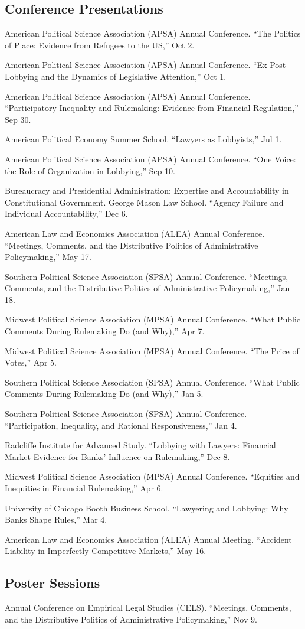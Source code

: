\documentclass[12pt,letterpaper]{report}
\newcommand{\talk}[4]{\item[#1]{\tab{}#3. \enquote{#2,} #4.}} %
\newcommand{\APSA}{American Political Science Association (APSA) Annual Conference}
\begin{document}
    \subsection*{Conference Presentations}
    \begin{tablist}
    \talk{2021}{The Politics of Place: Evidence from Refugees to the US}{\APSA}{Oct 2}
    \talk{2021}{Ex Post Lobbying and the Dynamics of Legislative Attention}{\APSA}{Oct 1}
    \talk{2021}{Participatory Inequality and Rulemaking: Evidence from Financial Regulation}{\APSA}{Sep 30}
    \talk{2021}{Lawyers as Lobbyists}{American Political Economy Summer School}{Jul 1}
    \talk{2020}{One Voice: the Role of Organization in Lobbying}{\APSA}{Sep 10}
    \talk{2019}{Agency Failure and Individual Accountability}{Bureaucracy and Presidential Administration: Expertise and Accountability in Constitutional Government. George Mason Law School}{Dec 6}
    \talk{2019}{Meetings, Comments, and the Distributive Politics of Administrative Policymaking}{American Law and Economics Association (ALEA) Annual Conference}{May 17}
    \talk{2019}{Meetings, Comments, and the Distributive Politics of Administrative Policymaking}{Southern Political Science Association (SPSA) Annual Conference}{Jan 18} 
    \talk{2018}{What Public Comments During Rulemaking Do (and Why)}{Midwest Political Science Association (MPSA) Annual Conference}{Apr 7}
    \talk{2018}{The Price of Votes}{Midwest Political Science Association (MPSA) Annual Conference}{Apr 5}
    \talk{2018}{What Public Comments During Rulemaking Do (and Why)}{Southern Political Science Association (SPSA) Annual Conference}{Jan 5} 
    \talk{2018}{Participation, Inequality, and Rational Responsiveness}{Southern Political Science Association (SPSA) Annual Conference}{Jan 4}    
    \talk{2017}{Lobbying with Lawyers: Financial Market Evidence for Banks’ Influence on Rulemaking}{Radcliffe Institute for Advanced Study}{Dec 8}
    \talk{2017}{Equities and Inequities in Financial Rulemaking}{Midwest Political Science Association (MPSA) Annual Conference}{Apr 6}
	\talk{2017}{Lawyering and Lobbying: Why Banks Shape Rules}{University of Chicago Booth Business School}{Mar 4}
	\talk{2015}{Accident Liability in Imperfectly Competitive Markets}{American Law and Economics Association (ALEA) Annual Meeting}{May 16}
    \end{tablist}
    
    \subsection*{Poster Sessions}
    \begin{tablist}
    \talk{2018}{Meetings, Comments, and the Distributive Politics of Administrative Policymaking}{Annual Conference on Empirical Legal Studies (CELS)}{Nov 9}
    \end{tablist}
\end{document}
